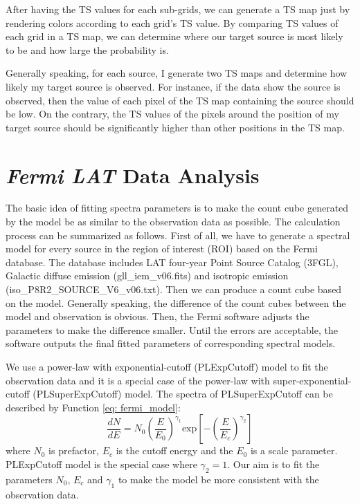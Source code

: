 \documentclass[12pt]{report}
\begin{document}
          After having the TS values for each sub-grids, we can generate a TS map just by 
          rendering colors according to each grid's TS value. By comparing TS values of 
          each grid in a TS map, we can 
          determine where our target source is most likely to be and how large the probability is. 
          
          Generally speaking, for each source, I generate two TS maps and determine how likely my target source
          is observed. For instance, if the data show the source is observed, then the value of each pixel
          of the TS map containing the source should be low. On the contrary, the TS values of the pixels around 
          the position of my target source should be significantly higher than other positions in the TS map.
          
          
            
        \section{\textit{Fermi LAT} Data Analysis}
          
        The basic idea of fitting spectra parameters is to make the count cube generated by the model be as similar 
        to the observation data as possible. The calculation process can be summarized as follows. First of all, we 
        have to generate a spectral model for every source in the region of interest (ROI) based on the Fermi database.
        The database includes LAT four-year Point Source Catalog (3FGL), Galactic diffuse emission (gll\_iem\_v06.fits)
        and isotropic emission (iso\_P8R2\_SOURCE\_V6\_v06.txt). 
        Then we can produce a count cube based on the model. Generally speaking, the difference of the 
        count cubes between the model and observation is obvious. Then, the Fermi software adjusts the parameters 
        to make the difference smaller. Until the errors are acceptable, the software outputs the final fitted 
        parameters of corresponding spectral models.  

        We use a power-law with exponential-cutoff (PLExpCutoff) model to fit the observation data and 
        it is a special case of the power-law with super-exponential-cutoff (PLSuperExpCutoff) model. 
        The spectra of PLSuperExpCutoff can be described by Function \ref{eq: fermi_model}:  
        \begin{equation} 
          \label{eq: fermi_model}
          \frac{dN}{dE} = N_{0} \left(\frac{E}{E_0}\right)^{\gamma_1}\mbox{exp}\left[-\left(\frac{E}{E_c}\right)^{\gamma_2}\right]
        \end{equation}
        where $N_0$ is prefactor, $E_c$ is the cutoff energy and the $E_0$ is a scale parameter. 
        PLExpCutoff model is the special case where $\gamma_2=1$. Our aim is to fit the parameters 
        $N_0$, $E_c$ and $\gamma_1$ to make the model be more consistent with the observation data.
\end{document}

